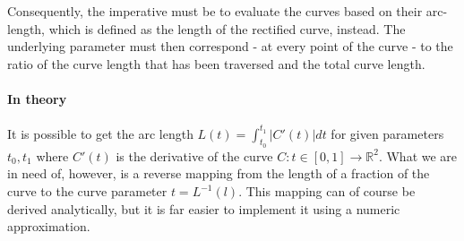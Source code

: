 \def\earpathf{(-1,1.5) .. controls (-1,2.3) and (1,2.8) .. (1,1.5) .. controls (1, -.2) and (0.3,-.1) .. (0.3,-1) .. controls (0.2,-1.5) and (-.5, -1.7) .. (-1,-1.25);}
\def\earpaths{(3,1.5) .. controls (3,2.3) and (5,2.8) .. (5,1.5) .. controls (5, -.2) and (4.3,-.1) .. (4.3,-1) .. controls (4.2,-1.5) and (3.5, -1.7) .. (3,-1.25);}
\begin{figure}[h!]
    \centering
\end{figure}

Consequently, the imperative must be to evaluate the curves based on their arc-length, which is defined as the length of the rectified curve, instead. The underlying parameter must then correspond - at every point of the curve - to the ratio of the curve length
that has been traversed and the total curve length.

\paragraph{In theory}
It is possible to get the arc length $L(t)=\int_{t_{0}}^{t_{1}} \left|C'(t)\right| dt$ for given parameters $t_{0}, t_{1}$ where $C'(t)$ is the derivative of the curve $C:t \in [0,1] \rightarrow \mathbb{R}^2$. What we are in need of, however, is a reverse mapping from the length of a fraction of the curve to the curve parameter $t = L^{-1}(l)$. 
This mapping can of course be derived analytically, but it is far easier to implement it using a numeric approximation. 

